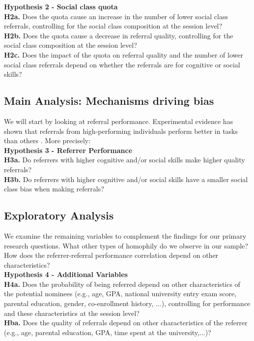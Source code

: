 \documentclass[11pt,a4paper,oneside]{article}
\begin{document}
\noindent\textbf{Hypothesis 2 - Social class quota}\\
\noindent\textbf{H2a.} Does the quota cause an increase in the number of lower social class referrals, controlling for the social class composition at the session level?  \\
\noindent\textbf{H2b.} Does the quota cause a decrease in referral quality, controlling for the social class composition at the session level? \\
\noindent\textbf{H2c.} Does the impact of the quota on referral quality and the number of lower social class referrals depend on whether the referrals are for cognitive or social skills?

\subsection{Main Analysis: Mechanisms driving bias}
We will start by looking at referral performance. Experimental evidence has shown that referrals from high-performing individuals perform better in tasks than others \citep{beaman_who_2012, beaman_job_2018,pallais_why_2016}. More precisely:\\

\noindent\textbf{Hypothesis 3 - Referrer Performance}\\
\noindent\textbf{H3a.} Do referrers with higher cognitive and/or social skills make higher quality referrals?  \\
\noindent\textbf{H3b.} Do referrers with higher cognitive and/or social skills have a smaller social class bias when making referrals?

\subsection{Exploratory Analysis}
We examine the remaining variables to complement the findings for our primary research questions. What other types of homophily do we observe in our sample? How does the referrer-referral performance correlation depend on other characteristics?     \\

\noindent\textbf{Hypothesis 4 - Additional Variables}\\
\noindent\textbf{H4a.} Does the probability of being referred depend on other characteristics of the potential nominees (e.g., age, GPA, national university entry exam score, parental education, gender, co-enrollment history, ...), controlling for performance and these characteristics at the session level? \\
\noindent\textbf{Hba.} Does the quality of referrals depend on other characteristics of the referrer (e.g., age, parental education, GPA, time spent at the university,...)? \\
\end{document}
